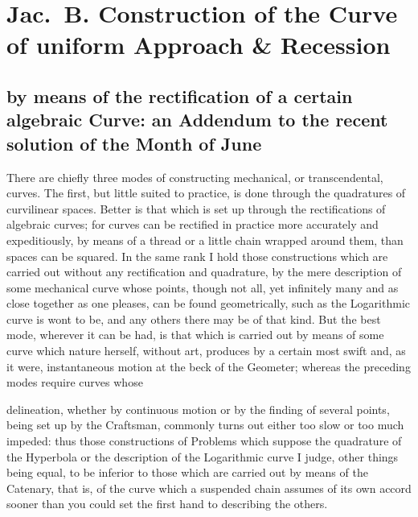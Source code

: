 \documentclass{article}
\begin{document}
\section*{Jac.\ B. Construction of the Curve of uniform Approach \& Recession}
\subsection*{by means of the rectification of a certain algebraic Curve: an Addendum to the recent solution of the Month of June}

There are chiefly three modes of constructing mechanical, or transcendental, curves. The first, but
little suited to practice, is done through the quadratures of curvilinear spaces. Better is that which
is set up through the rectifications of algebraic curves; for curves can be rectified in practice more
accurately and expeditiously, by means of a thread or a little chain wrapped around them, than spaces
can be squared. In the same rank I hold those constructions which are carried out without any
rectification and quadrature, by the mere description of some mechanical curve whose points, though
not all, yet infinitely many and as close together as one pleases, can be found geometrically, such
as the Logarithmic curve is wont to be, and any others there may be of that kind. But the best mode,
wherever it can be had, is that which is carried out by means of some curve which nature herself,
without art, produces by a certain most swift and, as it were, instantaneous motion at the beck of
the Geometer; whereas the preceding modes require curves whose

delineation, whether by continuous motion or by the finding of several points, being set up by the
Craftsman, commonly turns out either too slow or too much impeded: thus those constructions of
Problems which suppose the quadrature of the Hyperbola or the description of the Logarithmic curve I
judge, other things being equal, to be inferior to those which are carried out by means of the
Catenary, that is, of the curve which a suspended chain assumes of its own accord sooner than you
could set the first hand to describing the others.
\end{document}
